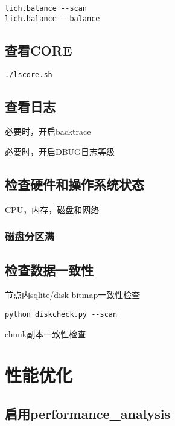 \begin{lstlisting}
lich.balance --scan
lich.balance --balance
\end{lstlisting}

\subsection{查看CORE}

\begin{lstlisting}
./lscore.sh
\end{lstlisting}

\subsection{查看日志}

必要时，开启backtrace

必要时，开启DBUG日志等级

\subsection{检查硬件和操作系统状态}

CPU，内存，磁盘和网络

\subsubsection{磁盘分区满}




\subsection{检查数据一致性}

节点内sqlite/disk bitmap一致性检查

\begin{lstlisting}
python diskcheck.py --scan
\end{lstlisting}

chunk副本一致性检查

\section{性能优化}

\subsection{启用performance\_analysis}

